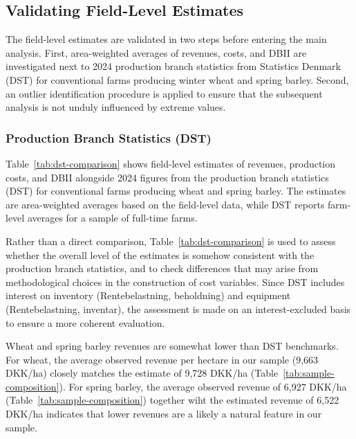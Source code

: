\documentclass[12pt]{article}
\begin{document}
\subsection{Validating Field-Level Estimates}
\label{sec:validating-estimates}
The field-level estimates are validated in two steps before entering the main analysis. 
First, area-weighted averages of revenues, costs, and DBII are investigated next to 2024 production branch statistics from Statistics Denmark (DST) for conventional farms producing winter wheat and spring barley. 
Second, an outlier identification procedure is applied to ensure that the subsequent analysis is not unduly influenced by extreme values.

\subsubsection{Production Branch Statistics (DST)}
Table~\ref{tab:dst-comparison} shows field-level estimates of revenues, production costs, and DBII alongside 2024 figures from the production branch statistics (DST) for conventional farms producing wheat and spring barley. 
The estimates are area-weighted averages based on the field-level data, while DST reports farm-level averages for a sample of full-time farms.

Rather than a direct comparison, Table~\ref{tab:dst-comparison} is used to assess whether the overall level of the estimates is somehow consistent with the production branch statistics, and to check differences that may arise from methodological choices in the construction of cost variables. 
Since DST includes interest on inventory (Rentebelastning, beholdning) and equipment (Rentebelastning, inventar), the assessment is made on an interest-excluded basis to ensure a more coherent evaluation.

Wheat and spring barley revenues are somewhat lower than DST benchmarks.
For wheat, the average observed revenue per hectare in our sample (9,663 DKK/ha) closely matches the estimate of 9,728 DKK/ha (Table~\ref{tab:sample-composition}). 
For spring barley, the average observed revenue of 6,927 DKK/ha (Table~\ref{tab:sample-composition}) together wiht the estimated revenue of 6,522 DKK/ha indicates that lower revenues are a likely a natural feature in our sample. 
\end{document}
